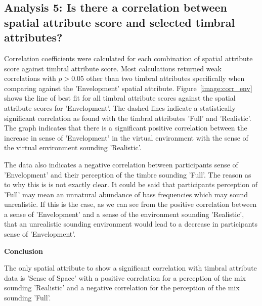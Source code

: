 















\subsection{Analysis 5: Is there a correlation between spatial attribute score and selected timbral attributes?}

	Correlation coefficients were calculated for each combination of spatial attribute score against timbral attribute score. Most calculations returned weak correlations with $p > 0.05$ other than two timbral attributes specifically when comparing against the 'Envelopment' spatial attribute. Figure~\ref{image:corr_env} shows the line of best fit for all timbral attribute scores against the spatial attribute scores for 'Envelopment'. The dashed lines indicate a statistically significant correlation as found with the timbral attributes 'Full' and 'Realistic'. The graph indicates that there is a significant positive correlation between the increase in sense of 'Envelopment' in the virtual environment with the sense of the virtual environment sounding 'Realistic'.

	The data also indicates a negative correlation between participants sense of 'Envelopment' and their perception of the timbre sounding 'Full'. The reason as to why this is is not exactly clear. It could be said that participants perception of 'Full' may mean an unnatural abundance of bass frequencies which may sound unrealistic. If this is the case, as we can see from the positive correlation between a sense of 'Envelopment' and a sense of the environment sounding 'Realistic', that an unrealistic sounding environment would lead to a decrease in participants sense of 'Envelopment'. 

	\textbf{Conclusion}

	The only spatial attribute to show a significant correlation with timbral attribute data is 'Sense of Space' with a positive correlation for a perception of the mix sounding 'Realistic' and a negative correlation for the perception of the mix sounding 'Full'.

